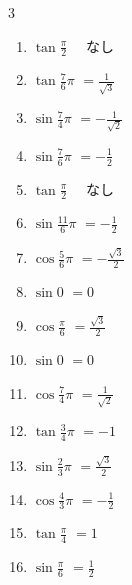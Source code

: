 \begin{multicols}{3}
\begin{enumerate}
  \item $\displaystyle \tan{\frac{\pi}{2}}$
        $\displaystyle \quad なし$

  \item $\displaystyle \tan{\frac{7}{6}\pi}$
        $\displaystyle =\frac{1}{\sqrt{3}}$

  \item $\displaystyle \sin{\frac{7}{4}\pi}$
        $\displaystyle =-\frac{1}{\sqrt{2}}$

  \item $\displaystyle \sin{\frac{7}{6}\pi}$
        $\displaystyle =-\frac{1}{2}$

  \item $\displaystyle \tan{\frac{\pi}{2}}$
        $\displaystyle \quad なし$

  \item $\displaystyle \sin{\frac{11}{6}\pi}$
        $\displaystyle =-\frac{1}{2}$

  \item $\displaystyle \cos{\frac{5}{6}\pi}$
        $\displaystyle =-\frac{\sqrt{3}}{2}$

  \item $\displaystyle \sin{0}$
        $\displaystyle =0$

  \item $\displaystyle \cos{\frac{\pi}{6}}$
        $\displaystyle =\frac{\sqrt{3}}{2}$

  \item $\displaystyle \sin{0}$
        $\displaystyle =0$

  \item $\displaystyle \cos{\frac{7}{4}\pi}$
        $\displaystyle =\frac{1}{\sqrt{2}}$

\columnbreak %

\resetques

  \item $\displaystyle \tan{\frac{3}{4}\pi}$
        $\displaystyle =-1$

  \item $\displaystyle \sin{\frac{2}{3}\pi}$
        $\displaystyle =\frac{\sqrt{3}}{2}$

  \item $\displaystyle \cos{\frac{4}{3}\pi}$
        $\displaystyle =-\frac{1}{2}$

  \item $\displaystyle \tan{\frac{\pi}{4}}$
        $\displaystyle =1$

  \item $\displaystyle \sin{\frac{\pi}{6}}$
        $\displaystyle =\frac{1}{2}$


\end{enumerate}
\end{multicols}
